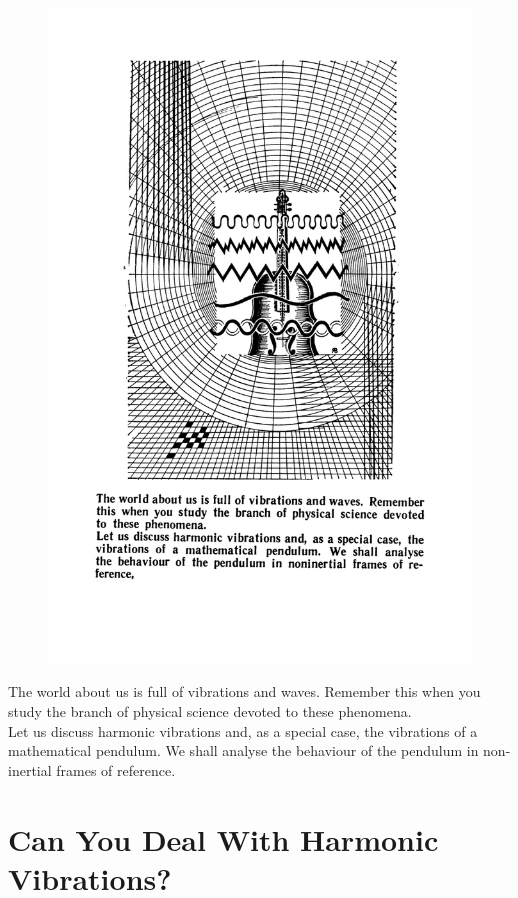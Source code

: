 \documentclass[a4paper,sfsidenotes]{tufte-book}
\begin{document}
\cleardoublepage
\thispagestyle{empty}
\vspace*{2cm}

\begin{figure}
\centering
\includegraphics[width=0.65\linewidth]{sec-e.pdf}
\end{figure}
\begin{fullwidth}
\begin{Large}
The world about us is full of vibrations and waves. Remember this when you study the branch of physical science devoted to these phenomena. 
\\
Let us discuss harmonic vibrations and, as a special case, the vibrations of a mathematical pendulum. We shall analyse the behaviour of the pendulum in non-inertial frames of reference.
\end{Large}
\end{fullwidth}

\chapter{Can You Deal With Harmonic Vibrations?}
\label{ch-11}
\end{document}
